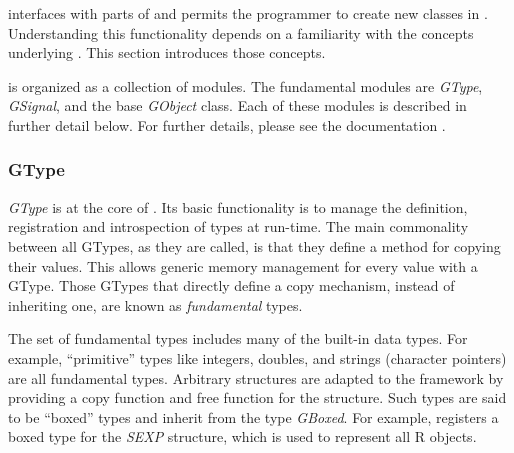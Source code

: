 \documentclass[article]{jss}
\begin{document}
 interfaces with parts of  and permits the
programmer to create new  classes in .
Understanding 
this functionality depends on a familiarity with the concepts
underlying 
. This section introduces those concepts.

 is organized as a collection of modules. The fundamental
modules are \emph{GType}, \emph{GSignal}, and the base
\emph{GObject} class. Each of these modules is described in further
detail below. 
For further details, please see the  documentation
\citep{gobject}.

\subsubsection{GType}\label{sec:gtype}
%



\emph{GType} is at the core of . Its basic functionality
is to manage the definition, registration and introspection of types
at run-time. The main commonality between all GTypes, as they are
called, is that they define a method for copying their values. This allows generic memory management for every value with a
GType. Those GTypes that directly define a copy mechanism, instead of
inheriting one, are known as \emph{fundamental} types.


The set of fundamental types includes many of the built-in  data types. For example, ``primitive'' types like integers, doubles, and strings (character pointers) are all fundamental types. Arbitrary  structures are adapted to the  framework by providing a copy function and free function for the structure. Such types are said to be ``boxed'' types and inherit from the type \emph{GBoxed}. For
example,  registers a boxed type for the  \emph{SEXP} structure, which is used to represent all R objects.
\end{document}

